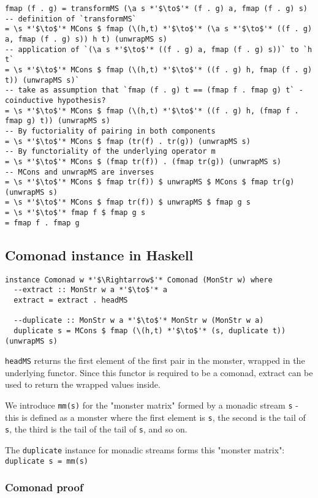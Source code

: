 \documentclass{article}
\begin{document}
\begin{lstlisting}
fmap (f . g) = transformMS (\a s *'$\to$'* (f . g) a, fmap (f . g) s)
-- definition of `transformMS`
= \s *'$\to$'* MCons $ fmap (\(h,t) *'$\to$'* (\a s *'$\to$'* ((f . g) a, fmap (f . g) s)) h t) (unwrapMS s)
-- application of `(\a s *'$\to$'* ((f . g) a, fmap (f . g) s))` to `h t`
= \s *'$\to$'* MCons $ fmap (\(h,t) *'$\to$'* ((f . g) h, fmap (f . g) t)) (unwrapMS s)`
-- take as assumption that `fmap (f . g) t == (fmap f . fmap g) t` - coinductive hypothesis?
= \s *'$\to$'* MCons $ fmap (\(h,t) *'$\to$'* ((f . g) h, (fmap f . fmap g) t)) (unwrapMS s)
-- By fuctoriality of pairing in both components
= \s *'$\to$'* MCons $ fmap (tr(f) . tr(g)) (unwrapMS s)
-- By functoriality of the underlying operator m
= \s *'$\to$'* MCons $ (fmap tr(f)) . (fmap tr(g)) (unwrapMS s)
-- MCons and unwrapMS are inverses
= \s *'$\to$'* MCons $ fmap tr(f)) $ unwrapMS $ MCons $ fmap tr(g) (unwrapMS s)
= \s *'$\to$'* MCons $ fmap tr(f)) $ unwrapMS $ fmap g s
= \s *'$\to$'* fmap f $ fmap g s
= fmap f . fmap g
\end{lstlisting}

\subsection{Comonad instance in Haskell}

\begin{lstlisting}
instance Comonad w *'$\Rightarrow$'* Comonad (MonStr w) where
  --extract :: MonStr w a *'$\to$'* a
  extract = extract . headMS
  
  --duplicate :: MonStr w a *'$\to$'* MonStr w (MonStr w a)
  duplicate s = MCons $ fmap (\(h,t) *'$\to$'* (s, duplicate t)) (unwrapMS s)
\end{lstlisting}

\verb+headMS+ returns the first element of the first pair in the monster, wrapped in the underlying functor. Since this functor is required to be a comonad, extract can be used to return the wrapped values inside.

We introduce \verb+mm(s)+ for the "monster matrix" formed by a monadic stream \verb+s+ - this is defined as a monster where the first element is \verb+s+, the second is the tail of \verb+s+, the third is the tail of the tail of \verb+s+, and so on.

The \verb+duplicate+ instance for monadic streams forms this "monster matrix": \verb+duplicate s = mm(s)+

\subsubsection{Comonad proof}
\end{document}
